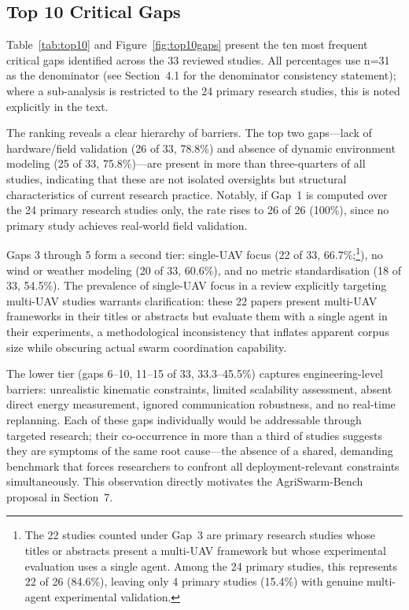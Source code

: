 \documentclass[review,3p,times]{elsarticle}
\begin{document}
\begin{itemize}
{\subsection{Top 10 Critical Gaps}
Table~\ref{tab:top10} and Figure~\ref{fig:top10gaps} present the ten most frequent critical gaps identified across the 33 reviewed studies. All percentages use n=31 as the denominator (see Section~4.1 for the denominator consistency statement); where a sub-analysis is restricted to the 24 primary research studies, this is noted explicitly in the text.

The ranking reveals a clear hierarchy of barriers. The top two gaps---lack of hardware/field validation (26 of 33, 78.8\%) and absence of dynamic environment modeling (25 of 33, 75.8\%)---are present in more than three-quarters of all studies, indicating that these are not isolated oversights but structural characteristics of current research practice. Notably, if Gap~1 is computed over the 24 primary research studies only, the rate rises to 26 of 26 (100\%), since no primary study achieves real-world field validation.

Gaps 3 through 5 form a second tier: single-UAV focus (22 of 33, 66.7\%;\footnote{The 22 studies counted under Gap~3 are primary research studies whose titles or abstracts present a multi-UAV framework but whose experimental evaluation uses a single agent. Among the 24 primary studies, this represents 22 of 26 (84.6\%), leaving only 4 primary studies (15.4\%) with genuine multi-agent experimental validation.}), no wind or weather modeling (20 of 33, 60.6\%), and no metric standardisation (18 of 33, 54.5\%). The prevalence of single-UAV focus in a review explicitly targeting multi-UAV studies warrants clarification: these 22 papers present multi-UAV frameworks in their titles or abstracts but evaluate them with a single agent in their experiments, a methodological inconsistency that inflates apparent corpus size while obscuring actual swarm coordination capability.

The lower tier (gaps 6--10, 11--15 of 33, 33.3--45.5\%) captures engineering-level barriers: unrealistic kinematic constraints, limited scalability assessment, absent direct energy measurement, ignored communication robustness, and no real-time replanning. Each of these gaps individually would be addressable through targeted research; their co-occurrence in more than a third of studies suggests they are symptoms of the same root cause---the absence of a shared, demanding benchmark that forces researchers to confront all deployment-relevant constraints simultaneously. This observation directly motivates the AgriSwarm-Bench proposal in Section~7.

}
\end{itemize}
\end{document}
